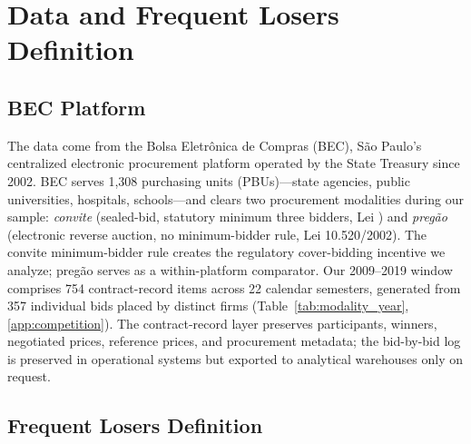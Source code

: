 
\section{Data and Frequent Losers Definition}
\label{sec:data}

\subsection{BEC Platform}
\label{sec:bec}

The data come from the Bolsa Eletr\^onica de Compras (BEC),
São Paulo's centralized electronic procurement platform
operated by the State Treasury since 2002. BEC serves 1,308
purchasing units (PBUs)---state agencies, public universities,
hospitals, schools---and clears two procurement modalities
during our sample: \emph{convite} (sealed-bid, statutory
minimum three bidders, Lei \valLeiOriginal) and \emph{preg\~ao}
(electronic reverse auction, no minimum-bidder rule, Lei
10.520/2002). The convite minimum-bidder rule creates the
regulatory cover-bidding incentive we analyze; preg\~ao serves
as a within-platform comparator. Our 2009--2019 window
comprises \valDataItemAvgVar{,}754 contract-record items
across 22 calendar semesters, generated from \valDataNbidsMean{,}357
individual bids placed by \valBECfirms distinct firms
(Table~\ref{tab:modality_year}, \ref{app:competition}). The
contract-record layer preserves participants, winners,
negotiated prices, reference prices, and procurement metadata;
the bid-by-bid log is preserved in operational systems but
exported to analytical warehouses only on request.

\subsection{Frequent Losers Definition}
\label{sec:fl_definition}

